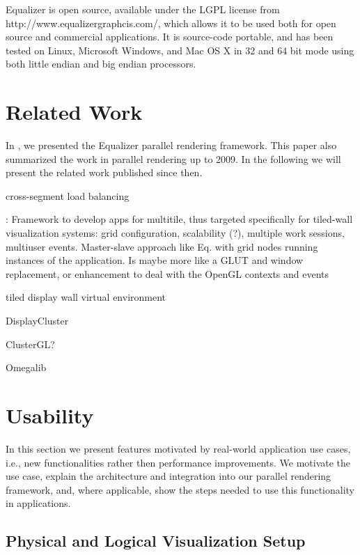 \documentclass[journal]{vgtc}                %
\begin{document}
Equalizer is open source, available under the LGPL license from http://www.equalizergraphcis.com/, which allows it to be used both for open source and commercial applications. It is source-code portable, and has been tested on Linux, Microsoft Windows, and Mac OS X in 32 and 64 bit mode using both little endian and big endian processors.


\section{Related Work}
\label{SEC_related}

In \cite{EMP:09}, we presented the Equalizer parallel rendering framework. This
paper also summarized the work in parallel rendering up to 2009. In the
following we will present the related work published since then.

\cite{EEP:11} cross-segment load balancing

\cite{DK:11}: Framework to develop apps for multitile, thus targeted
specifically for tiled-wall visualization systems: grid configuration,
scalability (?), multiple work sessions, multiuser events. Master-slave approach
like Eq. with grid nodes running instances of the application. Is maybe more
like a GLUT and window replacement, or enhancement to deal with the OpenGL
contexts and events

\cite{CKP:12} tiled display wall virtual environment

\cite{TBD} DisplayCluster

\cite{NHM:11} ClusterGL?

Omegalib

\section{Usability}

In this section we present features motivated by real-world application use
cases, i.e., new functionalities rather then performance improvements. We
motivate the use case, explain the architecture and integration into our
parallel rendering framework, and, where applicable, show the steps needed to
use this functionality in applications.

\subsection{Physical and Logical Visualization Setup}
\end{document}
